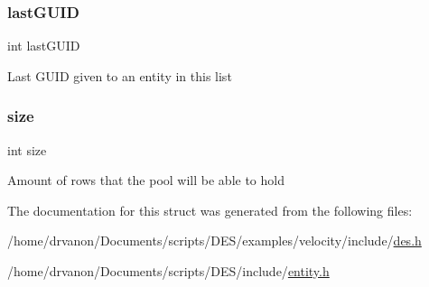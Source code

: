 \subsubsection{\texorpdfstring{last\+G\+U\+ID}{lastGUID}}
{\footnotesize\ttfamily int last\+G\+U\+ID}

Last G\+U\+ID given to an entity in this list \mbox{\label{struct_entity_pool_a439227feff9d7f55384e8780cfc2eb82}} 
\subsubsection{\texorpdfstring{size}{size}}
{\footnotesize\ttfamily int size}

Amount of rows that the pool will be able to hold 

The documentation for this struct was generated from the following files\+:\begin{DoxyCompactItemize}
\item 
/home/drvanon/\+Documents/scripts/\+D\+E\+S/examples/velocity/include/\mbox{\hyperlink{examples_2velocity_2include_2des_8h}{des.\+h}}\item 
/home/drvanon/\+Documents/scripts/\+D\+E\+S/include/\mbox{\hyperlink{entity_8h}{entity.\+h}}\end{DoxyCompactItemize}
